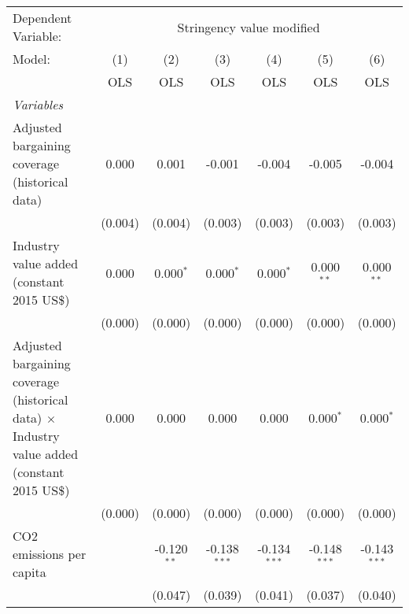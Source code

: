 
\begingroup
\centering
\begin{tabular}{lcccccc}
   \toprule
   Dependent Variable: & \multicolumn{6}{c}{Stringency value modified}\\
   Model:                                                                                              & (1)     & (2)           & (3)            & (4)            & (5)            & (6)\\  
                                                                                                       &  OLS    & OLS           & OLS            & OLS            & OLS            & OLS\\  
   \midrule
   \emph{Variables}\\
   Adjusted bargaining coverage (historical data)                                                      & 0.000   & 0.001         & -0.001         & -0.004         & -0.005         & -0.004\\   
                                                                                                       & (0.004) & (0.004)       & (0.003)        & (0.003)        & (0.003)        & (0.003)\\   
   Industry value added (constant 2015 US\$)                                                           & 0.000   & 0.000$^{*}$   & 0.000$^{*}$    & 0.000$^{*}$    & 0.000$^{**}$   & 0.000$^{**}$\\   
                                                                                                       & (0.000) & (0.000)       & (0.000)        & (0.000)        & (0.000)        & (0.000)\\   
   Adjusted bargaining coverage (historical data) $\times$ Industry value added (constant 2015 US\$)   & 0.000   & 0.000         & 0.000          & 0.000          & 0.000$^{*}$    & 0.000$^{*}$\\   
                                                                                                       & (0.000) & (0.000)       & (0.000)        & (0.000)        & (0.000)        & (0.000)\\   
   CO2 emissions per capita                                                                            &         & -0.120$^{**}$ & -0.138$^{***}$ & -0.134$^{***}$ & -0.148$^{***}$ & -0.143$^{***}$\\   
                                                                                                       &         & (0.047)       & (0.039)        & (0.041)        & (0.037)        & (0.040)\\   

\end{tabular}

